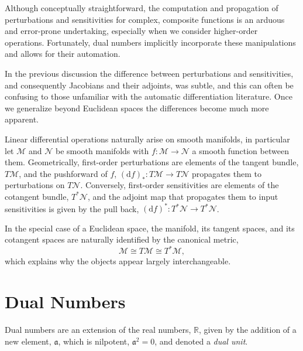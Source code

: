 Although conceptually straightforward, the computation and propagation of perturbations and 
sensitivities for complex, composite functions is an arduous and error-prone undertaking, especially
when we consider higher-order operations.  Fortunately, dual numbers implicitly incorporate these 
manipulations and allows for their automation.

\begin{tcolorbox}[colback=gray90,colframe=gray90, coltitle=black,
title=\textbf{Geometric Interpretation of Linear Differential Operations}]

In the previous discussion the difference between perturbations and sensitivities, and 
consequently Jacobians and their adjoints, was subtle, and this can often be
confusing to those unfamiliar with the automatic differentiation literature.  Once we
generalize beyond Euclidean spaces the differences become much more apparent.

\parindent=15pt

Linear differential operations naturally arise on smooth manifolds,
in particular let $\mathcal{M}$ and $\mathcal{N}$ be smooth manifolds with 
$f : \mathcal{M} \rightarrow \mathcal{N}$ a smooth function between them.  Geometrically,
first-order perturbations are elements of the tangent bundle, $T \mathcal{M}$, and the 
pushforward of $f$, $ \left( \mathrm{d} f \right)_{*} : T\mathcal{M} \rightarrow T \mathcal{N}$ 
propagates them to perturbations on $T \mathcal{N}$.  Conversely, first-order sensitivities are
elements of the cotangent bundle, $T^{*} \mathcal{N}$, and the adjoint map that propagates
them to input sensitivities is given by the pull back,
$ \left( \mathrm{d} f \right)^{*} : T^{*} \mathcal{N} \rightarrow T^{*} \mathcal{N}$.

In the special case of a Euclidean space, the manifold, its tangent spaces, and its cotangent
spaces are naturally identified by the canonical metric,
%
\begin{equation*}
\mathcal{M} \cong T \mathcal{M} \cong T^{*} \mathcal{M},
\end{equation*}
%
which explains why the objects appear largely interchangeable.

\end{tcolorbox}

\section{Dual Numbers}

Dual numbers are an extension of the real numbers, $\mathbb{R}$, given by the
addition of a new element, $\mathfrak{a}$, which is nilpotent, $\mathfrak{a}^{2} = 0$,
and denoted a \textit{dual unit}.

